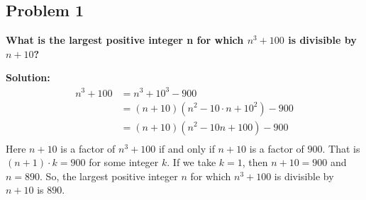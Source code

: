 \subsection{Problem 1}
\textbf{What is the largest positive integer n for which $n^3 + 100$ is divisible by $n + 10$?}
\par

\begin{flushleft}
\textbf{Solution: }
$$
\begin{aligned}
n^3 + 100 &= n^3 + 10^3 - 900 \\
&= (n + 10)(n^2 - 10 \cdot n + 10^2) - 900 \\
&= (n + 10)(n^2 - 10n + 100) - 900 \\
\end{aligned}
$$
Here $n + 10$ is a factor of $n^3 + 100$ if and only if $n + 10$ is a factor of $900$. 
That is $ (n+1) \cdot k = 900$ for some integer $k$.
If we take $ k = 1$, then $n + 10 = 900$ and $n = 890$.
So, the largest positive integer $n$ for which $n^3 + 100$ is divisible by $n + 10$ is $890$.
\par
\end{flushleft}